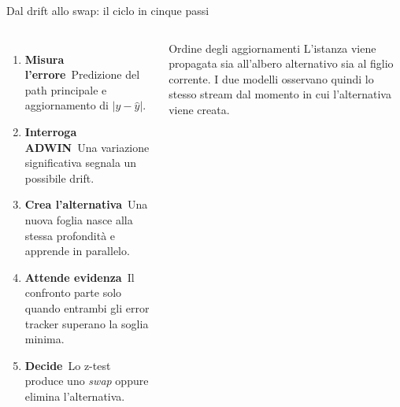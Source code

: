 \documentclass[aspectratio=169,10pt]{beamer}
\begin{document}
\begin{frame}{Dal drift allo swap: il ciclo in cinque passi}
  \begin{columns}[T]
    \begin{enumerate}
      \item \textbf{Misura l'errore}\
            Predizione del path principale e aggiornamento di
            $|y-\hat y|$.
      \item \textbf{Interroga ADWIN}\
            Una variazione significativa segnala un possibile drift.
      \item \textbf{Crea l'alternativa}\
            Una nuova foglia nasce alla stessa profondità e apprende
            in parallelo.
      \item \textbf{Attende evidenza}\
            Il confronto parte solo quando entrambi gli error tracker
            superano la soglia minima.
      \item \textbf{Decide}\
            Lo z-test produce uno \emph{swap} oppure elimina l'alternativa.
    \end{enumerate}

    \column{0.40\linewidth}
    \begin{alertblock}{Ordine degli aggiornamenti}
      \small
      L'istanza viene propagata sia all'albero alternativo sia al figlio
      corrente. I due modelli osservano quindi lo stesso stream dal momento
      in cui l'alternativa viene creata.
    \end{alertblock}

    \medskip
  \end{columns}
\end{frame}
\end{document}

